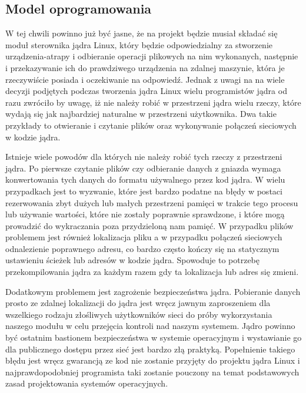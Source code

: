 \documentclass[10pt]{scrartcl}
\begin{document}
\subsection{Model oprogramowania}
\label{softmodel}

W tej chwili powinno już być jasne, że na projekt będzie musiał składać się moduł sterownika jądra Linux, który będzie odpowiedzialny za stworzenie urządzenia-atrapy i odbieranie operacji plikowych na nim wykonanych, następnie i przekazywanie ich do prawdziwego urządzenia na zdalnej maszynie, która je rzeczywiście posiada i oczekiwanie na odpowiedź. Jednak z uwagi na na wiele decyzji podjętych podczas tworzenia jądra Linux wielu programistów jądra od razu zwróciło by uwagę, iż nie należy robić w przestrzeni jądra wielu rzeczy, które wydają się jak najbardziej naturalne w przestrzeni użytkownika. Dwa takie przykłady to otwieranie i czytanie plików oraz wykonywanie połączeń sieciowych w kodzie jądra.

Istnieje wiele powodów dla których nie należy robić tych rzeczy z przestrzeni jądra. Po pierwsze czytanie plików czy odbieranie danych z gniazda wymaga konwertowania tych danych do formatu używalnego przez kod jądra. W wielu przypadkach jest to wyzwanie, które jest bardzo podatne na błędy w postaci rezerwowania zbyt dużych lub małych przestrzeni pamięci w trakcie tego procesu lub używanie wartości, które nie zostały poprawnie sprawdzone, i które mogą prowadzić do wykraczania poza przydzieloną nam pamięć. W przypadku plików problemem jest również lokalizacja pliku a w przypadku połączeń sieciowych odnalezienie poprawnego adresu, co bardzo często kończy się na statycznym ustawieniu ścieżek lub adresów w kodzie jądra. Spowoduje to potrzebę przekompilowania jądra za każdym razem gdy ta lokalizacja lub adres się zmieni.

Dodatkowym problemem jest zagrożenie bezpieczeństwa jądra. Pobieranie danych prosto ze zdalnej lokalizacji do jądra jest wręcz jawnym zaproszeniem dla wszelkiego rodzaju złośliwych użytkowników sieci do próby wykorzystania naszego modułu w celu przejęcia kontroli nad naszym systemem. Jądro powinno być ostatnim bastionem bezpieczeństwa w systemie operacyjnym i wystawianie go dla publicznego dostępu przez sieć jest bardzo złą praktyką. Popełnienie takiego błędu jest wręcz gwarancją ze kod nie zostanie przyjęty do projektu jądra Linux i najprawdopodobniej programista taki zostanie pouczony na temat podstawowych zasad projektowania systemów operacyjnych.
\end{document}
